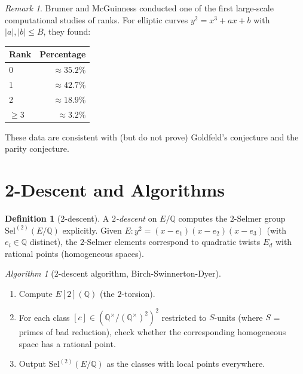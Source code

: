 \documentclass[12pt,a4paper]{amsart}
\theoremstyle{definition}
\newtheorem{definition}[theorem]{Definition}
\theoremstyle{remark}
\newtheorem{remark}[theorem]{Remark}
\newtheorem{algorithm}[theorem]{Algorithm}
\newcommand{\Q}{\mathbb{Q}}
\newcommand{\Sel}{\mathrm{Sel}}
\begin{document}
\begin{remark}
  Brumer and McGuinness \cite{BM1990} conducted one of the first large-scale
  computational studies of ranks. For elliptic curves $y^2 = x^3 + ax + b$ with
  $|a|, |b| \leq B$, they found:
  \begin{center}
    \begin{tabular}{lr}
      \toprule
      Rank & Percentage \\
      \midrule
      0 & $\approx 35.2\%$ \\
      1 & $\approx 42.7\%$ \\
      2 & $\approx 18.9\%$ \\
      $\geq 3$ & $\approx 3.2\%$ \\
      \bottomrule
    \end{tabular}
  \end{center}
  These data are consistent with (but do not prove) Goldfeld's conjecture and the
  parity conjecture.
\end{remark}

\section{2-Descent and Algorithms}\label{sec:descent}

\begin{definition}[$2$-descent]
  A \emph{$2$-descent} on $E/\Q$ computes the $2$-Selmer group
  $\Sel^{(2)}(E/\Q)$ explicitly. Given $E\colon y^2 = (x-e_1)(x-e_2)(x-e_3)$
  (with $e_i \in \Q$ distinct), the $2$-Selmer elements correspond to
  quadratic twists $E_d$ with rational points (homogeneous spaces).
\end{definition}

\begin{algorithm}[$2$-descent algorithm, Birch-Swinnerton-Dyer]
  \begin{enumerate}[label=(\arabic*)]
    \item Compute $E[2](\Q)$ (the $2$-torsion).
    \item For each class $[c] \in (\Q^\times / (\Q^\times)^2)^2$ restricted to
      $S$-units (where $S$ = primes of bad reduction), check whether the corresponding
      homogeneous space has a rational point.
    \item Output $\Sel^{(2)}(E/\Q)$ as the classes with local points everywhere.
  \end{enumerate}
\end{algorithm}
\end{document}
